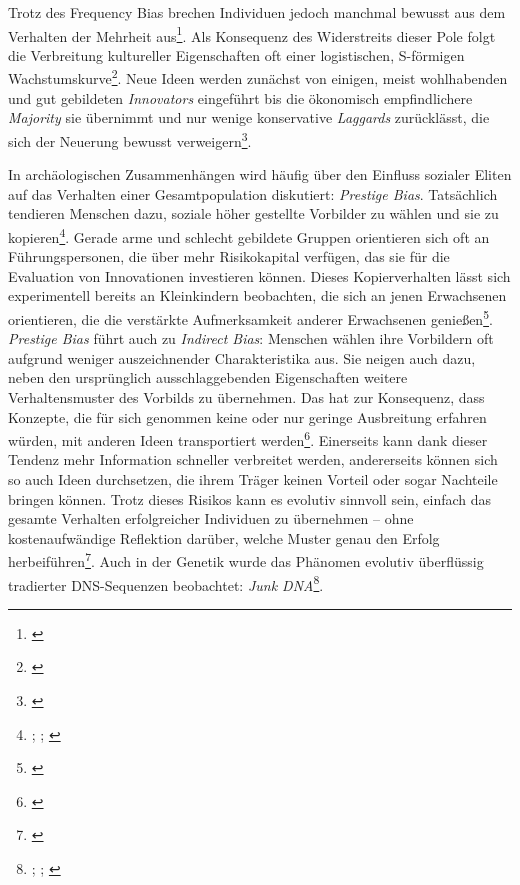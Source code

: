 \documentclass[openany,twoside,twocolumn]{book}
\let\rmarkdownfootnote\footnote%
\def\footnote{\protect\rmarkdownfootnote}
\begin{document}
Trotz des Frequency Bias brechen Individuen jedoch manchmal bewusst aus dem Verhalten der Mehrheit aus\footnote{\textcite{henrich_evolution_2003}}. Als Konsequenz des Widerstreits dieser Pole folgt die Verbreitung kultureller Eigenschaften oft einer logistischen, S-förmigen Wachstumskurve\footnote{\textcite{henrich_cultural_2001}}. Neue Ideen werden zunächst von einigen, meist wohlhabenden und gut gebildeten \emph{Innovators} eingeführt bis die ökonomisch empfindlichere \emph{Majority} sie übernimmt und nur wenige konservative \emph{Laggards} zurücklässt, die sich der Neuerung bewusst verweigern\footnote{\textcite{rogers_diffusion_1983}}.

In archäologischen Zusammenhängen wird häufig über den Einfluss sozialer Eliten auf das Verhalten einer Gesamtpopulation diskutiert: \emph{Prestige Bias}. Tatsächlich tendieren Menschen dazu, soziale höher gestellte Vorbilder zu wählen und sie zu kopieren\footnote{\textcite{barkow_prestige_1975}; \textcite{henrich_evolution_2001}; \textcite{schlag_why_1998}}. Gerade arme und schlecht gebildete Gruppen orientieren sich oft an Führungspersonen, die über mehr Risikokapital verfügen, das sie für die Evaluation von Innovationen investieren können. Dieses Kopierverhalten lässt sich experimentell bereits an Kleinkindern beobachten, die sich an jenen Erwachsenen orientieren, die die verstärkte Aufmerksamkeit anderer Erwachsenen genießen\footnote{\textcite{chudek_prestige-biased_2012}}. \emph{Prestige Bias} führt auch zu \emph{Indirect Bias}: Menschen wählen ihre Vorbildern oft aufgrund weniger auszeichnender Charakteristika aus. Sie neigen auch dazu, neben den ursprünglich ausschlaggebenden Eigenschaften weitere Verhaltensmuster des Vorbilds zu übernehmen. Das hat zur Konsequenz, dass Konzepte, die für sich genommen keine oder nur geringe Ausbreitung erfahren würden, mit anderen Ideen transportiert werden\footnote{\textcite{obrien_style_2003}}. Einerseits kann dank dieser Tendenz mehr Information schneller verbreitet werden, andererseits können sich so auch Ideen durchsetzen, die ihrem Träger keinen Vorteil oder sogar Nachteile bringen können. Trotz dieses Risikos kann es evolutiv sinnvoll sein, einfach das gesamte Verhalten erfolgreicher Individuen zu übernehmen -- ohne kostenaufwändige Reflektion darüber, welche Muster genau den Erfolg herbeiführen\footnote{\textcite{smith_cultural_1992}}. Auch in der Genetik wurde das Phänomen evolutiv überflüssig tradierter DNS-Sequenzen beobachtet: \emph{Junk DNA}\footnote{\textcite{doolittle_selfish_1980}; \textcite{gibbs_unseen_2003}; \textcite{orgel_selfish_1980}}.
\end{document}
